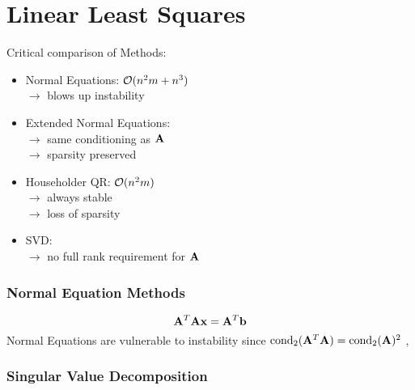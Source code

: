 \part{Linear Least Squares}
\setcounter{section}{0}
Critical comparison of Methods:
\begin{itemize}
  \item Normal Equations: $\mathcal{O}(n^2 m + n^3)$ \\
  	$\rightarrow$ blows up instability
  \item Extended Normal Equations:  \\
  	$\rightarrow$ same conditioning as $\mathbf{A}$ \\
  	$\rightarrow$ sparsity preserved
  \item Householder QR: $\mathcal{O}(n^2 m)$ \\
  	$\rightarrow$ always stable \\
  	$\rightarrow$ loss of sparsity
  \item SVD:  \\
  	$\rightarrow$ no full rank requirement for $\mathbf{A}$ \\
\end{itemize}

\section{Normal Equation Methods}
$$ \mathbf{A}^T \mathbf{A} \mathbf{x} = \mathbf{A}^T \mathbf{b}$$
\Warning Normal Equations are vulnerable to instability since $\operatorname{cond}_2(\mathbf{A}^T \mathbf{A}) = \operatorname{cond}_2(\mathbf{A})^2$
\sep



\section{Singular Value Decomposition}

